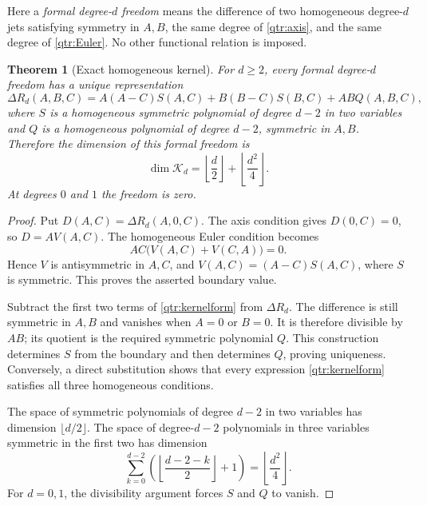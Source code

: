 \documentclass[11pt,a4paper]{article}
\numberwithin{equation}{section}
\newtheorem{theorem}{Theorem}[section]
\theoremstyle{definition}
\theoremstyle{remark}
\begin{document}
Here a \emph{formal degree-\(d\) freedom} means the difference of
two homogeneous degree-\(d\) jets satisfying symmetry in \(A,B\),
the same degree of \eqref{qtr:axis}, and the same degree of
\eqref{qtr:Euler}. No other functional relation is imposed.

\begin{theorem}[Exact homogeneous kernel]\label{qtr:kernel}
For \(d\ge2\), every formal degree-\(d\) freedom has a unique
representation
\begin{equation}\label{qtr:kernelform}
 \Delta R_d(A,B,C)=
 A(A-C)S(A,C)+B(B-C)S(B,C)+ABQ(A,B,C),
\end{equation}
where \(S\) is a homogeneous symmetric polynomial of degree
\(d-2\) in two variables and \(Q\) is a homogeneous polynomial of
degree \(d-2\), symmetric in \(A,B\). Therefore the dimension of
this formal freedom is
\begin{equation}\label{qtr:dimension}
 \dim\mathcal K_d
 =\left\lfloor\frac d2\right\rfloor
     +\left\lfloor\frac{d^2}{4}\right\rfloor.
\end{equation}
At degrees \(0\) and \(1\) the freedom is zero.
\end{theorem}

\begin{proof}
Put \(D(A,C)=\Delta R_d(A,0,C)\). The axis condition gives
\(D(0,C)=0\), so \(D=A V(A,C)\). The homogeneous Euler
condition becomes
\[
 AC\bigl(V(A,C)+V(C,A)\bigr)=0.
\]
Hence \(V\) is antisymmetric in \(A,C\), and
\(V(A,C)=(A-C)S(A,C)\), where \(S\) is symmetric.
This proves the asserted boundary value.

Subtract the first two terms of \eqref{qtr:kernelform} from
\(\Delta R_d\). The difference is still symmetric in \(A,B\)
and vanishes when \(A=0\) or \(B=0\). It is therefore divisible
by \(AB\); its quotient is the required symmetric polynomial
\(Q\). This construction determines \(S\) from the boundary
and then determines \(Q\), proving uniqueness. Conversely, a
direct substitution shows that every expression
\eqref{qtr:kernelform} satisfies all three homogeneous
conditions.

The space of symmetric polynomials of degree \(d-2\) in two
variables has dimension \(\lfloor d/2\rfloor\). The space
of degree-\(d-2\) polynomials in three variables symmetric
in the first two has dimension
\[
 \sum_{k=0}^{d-2}
 \left(\left\lfloor\frac{d-2-k}{2}\right\rfloor+1\right)
 =\left\lfloor\frac{d^2}{4}\right\rfloor.
\]
For \(d=0,1\), the divisibility argument forces \(S\) and \(Q\)
to vanish.
\end{proof}
\end{document}
